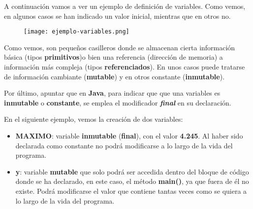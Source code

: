 A continuación vamos a ver un ejemplo de definición de variables. Como vemos, en algunos casos se han indicado un valor inicial, mientras que en otros no.

\begin{figure}[H]
    \centering
    \texttt{[image: ejemplo-variables.png]}
\end{figure}

Como vemos, son pequeños casilleros donde se almacenan cierta información básica (tipos \textbf{primitivos})o bien una referencia (dirección de memoria) a información más compleja (tipos \textbf{referenciados}). En unos casos puede tratarse de información cambiante (\textbf{mutable}) y en otros constante (\textbf{inmutable}).

Por último, apuntar que en \textbf{Java}, para indicar que que una variables es \textbf{inmutable} o \textbf{constante}, se emplea el modificador \textbf{\textit{final}} en su declaración.

En el siguiente ejemplo, vemos la creación de dos variables:

\begin{itemize}
    \item \textbf{MAXIMO}: variable \textbf{inmutable} (\textbf{final}), con el valor \textbf{4.245}. Al haber sido declarada como constante no podrá modificarse a lo largo de la vida del programa.

    \item \textbf{y}: variable \textbf{mutable} que solo podrá ser accedida dentro del bloque de código donde se ha declarado, en este caso, el método \textbf{main()}, ya que fuera de él no existe. Podrá modificarse el valor que contiene tantas veces como se quiera a lo largo de la vida del programa.
\end{itemize}


\newpage
{}



